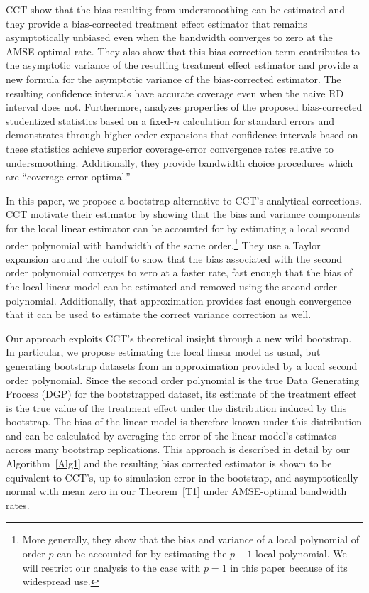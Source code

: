 \documentclass[12pt,fleqn]{article}
\begin{document}
CCT show that the bias resulting from undersmoothing can be estimated and they
provide a bias-corrected treatment effect estimator that remains
asymptotically unbiased even when the bandwidth converges to zero at the
AMSE-optimal rate. They also show that this bias-correction term contributes
to the asymptotic variance of the resulting treatment effect estimator and
provide a new formula for the asymptotic variance of the bias-corrected
estimator. The resulting confidence intervals have accurate coverage even when
the naive RD interval does not. Furthermore, \cite{CCF15} analyzes properties of
the proposed bias-corrected studentized statistics based on a fixed-$n$ calculation
 for standard errors and demonstrates through higher-order expansions that confidence intervals based on these
 statistics achieve superior coverage-error convergence rates relative to undersmoothing.
Additionally, they provide bandwidth choice procedures which are ``coverage-error optimal.''

In this paper, we propose a bootstrap alternative to CCT's analytical
corrections. CCT motivate their estimator by showing that the bias and
variance components for the local linear estimator can be accounted for by
estimating a local second order polynomial with bandwidth of the same
order.\footnote{%
  More generally, they show that the bias and variance of a local polynomial
  of order $p$ can be accounted for by estimating the $p+1$ local
  polynomial. We will restrict our analysis to the case with $p = 1$ in this
  paper because of its widespread use.} %
They use a Taylor expansion around the cutoff to show that the bias associated
with the second order polynomial converges to zero at a faster rate, fast
enough that the bias of the local linear model can be estimated and removed
using the second order polynomial. Additionally, that approximation provides
fast enough convergence that it can be used to estimate the correct variance
correction as well.

Our approach exploits CCT's theoretical insight through a new wild
bootstrap. In particular, we propose estimating the local linear model as usual,
but generating bootstrap datasets from an approximation provided by a local
second order polynomial. Since the second order polynomial is the true Data
Generating Process (DGP) for the bootstrapped dataset,
its estimate of the treatment effect is the true value of the treatment effect
under the distribution induced by this bootstrap. The bias of the linear model
is therefore known
under this distribution and can be calculated by averaging the error of the
linear model's estimates across many bootstrap replications. This approach is
described in detail by our Algorithm~\ref{Alg1} and the resulting bias corrected
estimator is shown to be equivalent to CCT's, up to simulation error in the
bootstrap, and asymptotically normal with mean zero in our
Theorem~\ref{T1} under AMSE-optimal bandwidth rates.
\end{document}
